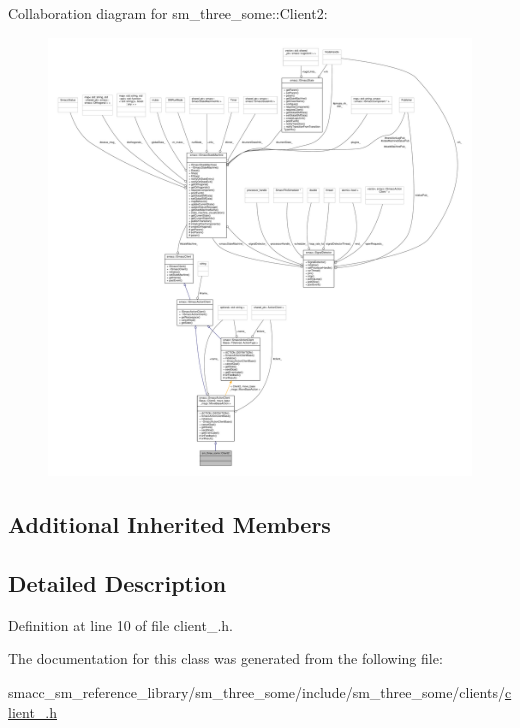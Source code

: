 Collaboration diagram for sm\+\_\+three\+\_\+some\+:\+:Client2\+:
\nopagebreak
\begin{figure}[H]
\begin{center}
\leavevmode
\includegraphics[width=350pt]{classsm__three__some_1_1Client2__coll__graph}
\end{center}
\end{figure}
\subsection*{Additional Inherited Members}


\subsection{Detailed Description}


Definition at line 10 of file client\+\_.\+h.



The documentation for this class was generated from the following file\+:\begin{DoxyCompactItemize}
\item 
smacc\+\_\+sm\+\_\+reference\+\_\+library/sm\+\_\+three\+\_\+some/include/sm\+\_\+three\+\_\+some/clients/\hyperlink{client__2_8h}{client\+\_.\+h}\end{DoxyCompactItemize}
